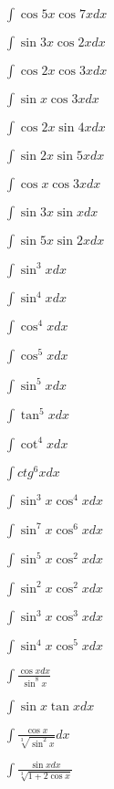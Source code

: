 
\begin{multicols}{2}
$\displaystyle \int \cos 5x \cos 7x dx$

$\displaystyle \int \sin 3x \cos 2x dx$

$\displaystyle \int \cos 2x \cos 3x dx$

$\displaystyle \int \sin x \cos 3x dx$

$\displaystyle \int \cos 2x \sin 4x dx$

$\displaystyle \int \sin 2x \sin 5x dx$

$\displaystyle \int \cos x \cos 3x dx$

$\displaystyle \int \sin 3x \sin x dx$

$\displaystyle \int \sin 5x \sin 2x dx$

$\displaystyle \int \sin^3 x dx$

$\displaystyle \int \sin^4 x dx$

$\displaystyle \int \cos^4 x dx$

$\displaystyle \int \cos^5 x dx$

$\displaystyle \int \sin^5 x dx$

$\displaystyle \int \tan^5 x dx$

$\displaystyle \int \cot^4 x dx$

$\displaystyle \int ctg^6 x dx$

$\displaystyle \int \sin^3 x \cos^4 x dx$

$\displaystyle \int \sin^7 x \cos^6 x dx$

$\displaystyle \int \sin^5 x \cos^2 x dx$

$\displaystyle \int \sin^2 x \cos^2 x dx$

$\displaystyle \int \sin^3 x \cos^3 x dx$

$\displaystyle \int \sin^4 x \cos^5 x dx$

$\displaystyle \int \frac{\cos x dx}{\sin^8 x}$

$\displaystyle \int \sin x \tan x dx$

$\displaystyle \int \frac{\cos x}{\sqrt[3]{\sin^2 x}}dx$

$\displaystyle \int \frac{\sin x dx}{\sqrt[3]{1+2\cos x}}$


\end{multicols}
